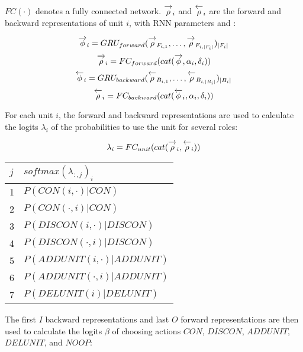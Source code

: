 \documentclass{article}[12px]
\newcommand{\ora}[1]{\overrightarrow{#1\vphantom{j}}}
\newcommand{\ola}[1]{\overleftarrow{#1\vphantom{j}}}
\begin{document}
\(FC(\cdot)\) denotes a fully connected network. \(\ora{\rho}_i\) and \(\ola{\rho}_i\) are the forward and backward representations of unit \(i\), with RNN parameters \ora{\theta} and \ola{\theta}:

\begin{equation}
  \ora{\phi}_i = GRU_{forward}(\ora{\rho}_{F_{i,1}}, \ldots, \ora{\rho}_{F_{i,|F_i|}})_{|F_i|}
\end{equation}
\begin{equation}
  \ora{\rho}_i = FC_{forward}(cat(\ora{\phi}, \alpha_i, \delta_i))
\end{equation}
\begin{equation}
  \ola{\phi}_i = GRU_{backward}(\ola{\rho}_{B_{i,1}}, \ldots, \ola{\rho}_{B_{i,|B_i|}})_{|B_i|}
\end{equation}
\begin{equation}
  \ola{\rho}_i = FC_{backward}(cat(\ola{\phi}_i, \alpha_i, \delta_i))
\end{equation}

For each unit \(i\), the forward and backward representations are used to calculate the logits \(\lambda_i\) of the probabilities to use the unit for several roles:

\begin{equation}
  \lambda_i = FC_{unit}(cat(\ora{\rho}_i, \ola{\rho}_i))
\end{equation}

\begin{center}
  \begin{tabular}{| l | l |}
    \hline
    \(j\) & \(softmax(\lambda_{:,j})_i\) \\
    \hline
    1 & \(P(CON(i, \cdot) | CON)\) \\
    2 & \(P(CON(\cdot, i) | CON)\) \\
    3 & \(P(DISCON(i, \cdot) | DISCON)\) \\
    4 & \(P(DISCON(\cdot, i) | DISCON)\) \\
    5 & \(P(ADDUNIT(i, \cdot) | ADDUNIT)\) \\
    6 & \(P(ADDUNIT(\cdot, i) | ADDUNIT)\) \\
    7 & \(P(DELUNIT(i) | DELUNIT)\) \\
    \hline
  \end{tabular}
\end{center}

The first \(I\) backward representations and last \(O\) forward representations are then used to calculate the logits \(\beta\) of choosing actions \(CON\), \(DISCON\), \(ADDUNIT\), \(DELUNIT\), and \(NOOP\):
\end{document}
